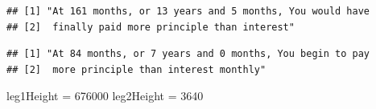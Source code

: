 \documentclass[12pt]{article}
\newcommand{\skipline}{\vspace{\baselineskip}}
\newenvironment{Section}[1]{}{\newpage}
\newenvironment{Shaded}{\begin{snugshade}}{\end{snugshade}}
\newcommand{\ControlFlowTok}[1]{\textcolor[rgb]{0.13,0.29,0.53}{\textbf{#1}}}
\newcommand{\DecValTok}[1]{\textcolor[rgb]{0.00,0.00,0.81}{#1}}
\newcommand{\KeywordTok}[1]{\textcolor[rgb]{0.13,0.29,0.53}{\textbf{#1}}}
\newcommand{\NormalTok}[1]{#1}
\newcommand{\OperatorTok}[1]{\textcolor[rgb]{0.81,0.36,0.00}{\textbf{#1}}}
\newcommand{\StringTok}[1]{\textcolor[rgb]{0.31,0.60,0.02}{#1}}
\begin{document}
\begin{Section}{Example A}
\begin{singlespace}
\begin{Shaded}
\end{Shaded}

\begin{verbatim}
## [1] "At 161 months, or 13 years and 5 months, You would have 
## [2]  finally paid more principle than interest"
\end{verbatim}
\begin{verbatim}
## [1] "At 84 months, or 7 years and 0 months, You begin to pay 
## [2]  more principle than interest monthly"
\end{verbatim}
\skipline \skipline 
\begin{Shaded}
\begin{Highlighting}[]
\NormalTok{leg1Height =}\StringTok{ }\DecValTok{676000}
\NormalTok{leg2Height =}\StringTok{ }\DecValTok{3640}


\end{Highlighting}
\end{Shaded}
\end{singlespace}
\end{Section}
\end{document}
